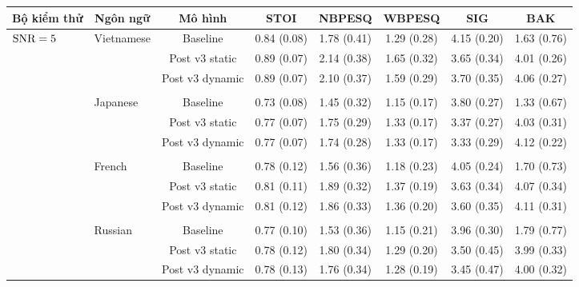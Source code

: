 		\begin{sidewaystable} \ContinuedFloat
			\centering
			\begin{subtable}{\textwidth}
				\centering
				\begin{tabular}{llcccccc}
					\hline
					\multicolumn{1}{c}{\textbf{Bộ kiểm thử}}	& \multicolumn{1}{c}{\textbf{Ngôn ngữ}}	& \textbf{Mô hình}	& \textbf{STOI}	& \textbf{NBPESQ}	& \textbf{WBPESQ}	& \textbf{SIG}	& \textbf{BAK} \\
					\hline
					\multirow{27}{*}{$\text{SNR}=5$}       & \multirow{3}{*}{Vietnamese}     &Baseline       & 0.84 (0.08)   & 1.78 (0.41)   & 1.29 (0.28)   & 4.15 (0.20)   & 1.63 (0.76) \\
					&               &Post v3 static & 0.89 (0.07)   & 2.14 (0.38)   & 1.65 (0.32)   & 3.65 (0.34)   & 4.01 (0.26) \\
					&				&Post v3 dynamic        & 0.89 (0.07)   & 2.10 (0.37)   & 1.59 (0.29)   & 3.70 (0.35)   & 4.06 (0.27) \\
					&&&&&&&\\
					& \multirow{3}{*}{Japanese}     &Baseline       & 0.73 (0.08)   & 1.45 (0.32)   & 1.15 (0.17)   & 3.80 (0.27)   & 1.33 (0.67) \\
					&               &Post v3 static & 0.77 (0.07)   & 1.75 (0.29)   & 1.33 (0.17)   & 3.37 (0.27)   & 4.03 (0.31) \\
					&               &Post v3 dynamic        & 0.77 (0.07)   & 1.74 (0.28)   & 1.33 (0.17)   & 3.33 (0.29)   & 4.12 (0.22) \\
					&&&&&&&\\
					& \multirow{3}{*}{French}       &Baseline       & 0.78 (0.12)   & 1.56 (0.36)   & 1.18 (0.23)   & 4.05 (0.24)   & 1.70 (0.73) \\
					&               &Post v3 static & 0.81 (0.11)   & 1.89 (0.32)   & 1.37 (0.19)   & 3.63 (0.34)   & 4.07 (0.34) \\
					&               &Post v3 dynamic        & 0.81 (0.12)   & 1.86 (0.33)   & 1.36 (0.20)   & 3.60 (0.35)   & 4.11 (0.31) \\
					&&&&&&&\\
					& \multirow{3}{*}{Russian}      &Baseline       & 0.77 (0.10)   & 1.53 (0.36)   & 1.15 (0.21)   & 3.96 (0.30)   & 1.79 (0.77) \\
					&               &Post v3 static & 0.78 (0.12)   & 1.80 (0.34)   & 1.29 (0.20)   & 3.50 (0.45)   & 3.99 (0.33) \\
					&               &Post v3 dynamic        & 0.78 (0.13)   & 1.76 (0.34)   & 1.28 (0.19)   & 3.45 (0.47)   & 4.00 (0.32) \\

\end{tabular}
\end{subtable}
\end{sidewaystable}
